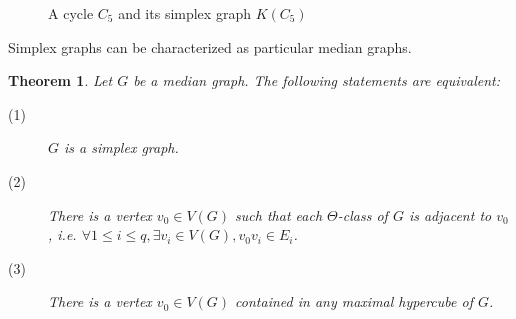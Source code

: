 \documentclass{article}
\newtheorem{theorem}{Theorem}
\begin{document}
\begin{figure}[h]
\begin{subfigure}[b]{0.49\columnwidth}
\centering
\scalebox{0.7}{}
\end{subfigure}
\begin{subfigure}[b]{0.49\columnwidth}
\centering
\scalebox{0.7}{}
\end{subfigure}
\caption{A cycle $C_5$ and its simplex graph $K(C_5)$}
\label{fig:example_simplex}
\end{figure}

Simplex graphs can be characterized as particular median graphs.

\begin{theorem}
Let $G$ be a median graph. The following statements are equivalent:
\begin{description}
    \item[(1)] $G$ is a simplex graph.
    \item[(2)] There is a vertex $v_0 \in V(G)$ such that each $\Theta$-class of $G$ is adjacent to $v_0$, {\em i.e.} $\forall 1\le i\le q, \exists v_i\in V(G), v_0v_i \in E_i$.
    \item[(3)] There is a vertex $v_0 \in V(G)$ contained in any maximal hypercube of $G$.
\end{description}
\label{th:simplex}
\end{theorem}
\end{document}
